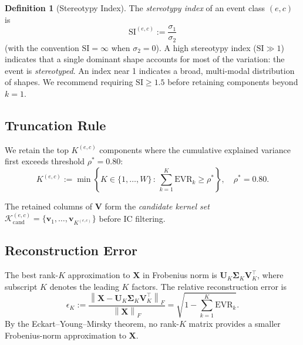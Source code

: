 \documentclass[11pt,a4paper]{article}
\theoremstyle{definition}
\newtheorem{definition}{Definition}[section]
\theoremstyle{plain}
\newcommand{\Xmat}{\mathbf{X}}
\newcommand{\Umat}{\mathbf{U}}
\newcommand{\Smat}{\boldsymbol{\Sigma}}
\newcommand{\Vmat}{\mathbf{V}}
\newcommand{\bvec}[1]{\mathbf{#1}}
\newcommand{\norm}[1]{\left\lVert #1 \right\rVert}
\begin{document}
\begin{definition}[Stereotypy Index]
\label{def:stereotypy}
The \emph{stereotypy index} of an event class $(e, c)$ is
\begin{equation}
    \mathrm{SI}^{(e,c)} := \frac{\sigma_1}{\sigma_2}
    \label{eq:stereotypy}
\end{equation}
(with the convention $\mathrm{SI} = \infty$ when $\sigma_2 = 0$). A high stereotypy
index ($\mathrm{SI} \gg 1$) indicates that a single dominant shape accounts for most of
the variation: the event is \emph{stereotyped}. An index near 1 indicates a broad,
multi-modal distribution of shapes. We recommend requiring $\mathrm{SI} \geq 1.5$ before
retaining components beyond $k = 1$.
\end{definition}

\subsection{Truncation Rule}

We retain the top $K^{(e,c)}$ components where the cumulative explained variance first
exceeds threshold $\rho^* = 0.80$:
\begin{equation}
    K^{(e,c)} :=
    \min\!\left\{
        K \in \{1, \ldots, W\} \,:\,
        \sum_{k=1}^{K} \mathrm{EVR}_k \geq \rho^*
    \right\}, \quad \rho^* = 0.80.
    \label{eq:truncation}
\end{equation}

The retained columns of $\Vmat$ form the \emph{candidate kernel set}
$\mathcal{K}^{(e,c)}_{\mathrm{cand}} = \{\bvec{v}_1, \ldots, \bvec{v}_{K^{(e,c)}}\}$
before IC filtering.

\subsection{Reconstruction Error}

The best rank-$K$ approximation to $\Xmat$ in Frobenius norm is $\Umat_K \Smat_K
\Vmat_K^\top$, where subscript $K$ denotes the leading $K$ factors. The relative
reconstruction error is
\begin{equation}
    \epsilon_K :=
    \frac{\norm{\Xmat - \Umat_K \Smat_K \Vmat_K^\top}_F}
         {\norm{\Xmat}_F}
    = \sqrt{1 - \sum_{k=1}^{K} \mathrm{EVR}_k}.
    \label{eq:recon_error}
\end{equation}
By the Eckart--Young--Mirsky theorem, no rank-$K$ matrix provides a smaller
Frobenius-norm approximation to $\Xmat$.

\end{document}
